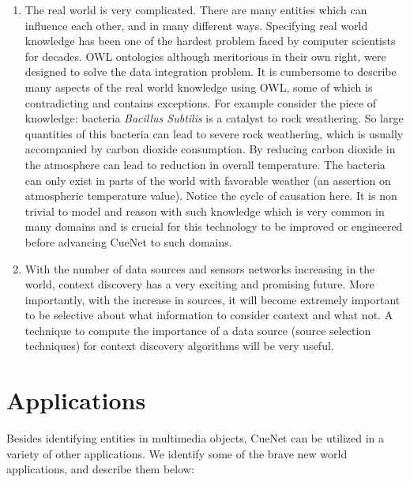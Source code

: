 \begin{enumerate}
\item The real world is very complicated. There are many entities which can influence each other, and in many different ways. Specifying real world knowledge has been one of the hardest problem faced by computer scientists for decades. OWL ontologies although meritorious in their own right, were designed to solve the data integration problem. It is cumbersome to describe many aspects of the real world knowledge using OWL, some of which is contradicting and contains exceptions. For example consider the piece of knowledge: bacteria \textit{Bacillus Subtilis} is a catalyst to rock weathering. So large quantities of this bacteria can lead to severe rock weathering, which is usually accompanied by carbon dioxide consumption. By reducing carbon dioxide in the atmosphere can lead to reduction in overall temperature. The bacteria can only exist in parts of the world with favorable weather (an assertion on atmospheric temperature value). Notice the cycle of causation here. It is non trivial to model and reason with such knowledge which is very common in many domains and is crucial for this technology to be improved or engineered before advancing CueNet to such domains.

\item With the number of data sources and sensors networks increasing in the world, context discovery has a very exciting and promising future. More importantly, with the increase in sources, it will become extremely important to be selective about what information to consider context and what not. A technique to compute the importance of a data source (source selection techniques) for context discovery algorithms will be very useful.

\end{enumerate}

\section{Applications}
Besides identifying entities in multimedia objects, CueNet can be utilized in a variety of other applications. We identify some of the brave new world applications, and describe them below:

